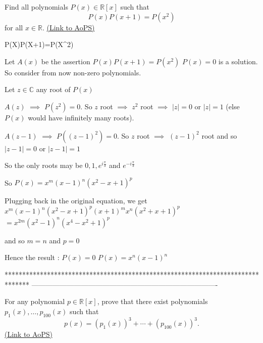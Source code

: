 \begin{problem}
	Find all polynomials $ P(x)\in\mathbb R[x]$ such that \[ P(x)P(x+1)=P(x^2)\] for all $x \in \mathbb R$.
	\flushright \href{https://artofproblemsolving.com/community/c6h316390}{(Link to AoPS)}
\end{problem}



\begin{solution}
	\begin{tcolorbox}P(X)P(X+1)=P(X^2)\end{tcolorbox}

Let $ A(x)$ be the assertion $ P(x)P(x+1)=P(x^2)$
$ P(x)=0$ is a solution. So consider from now non-zero polynomials.

Let $ z\in\mathbb C$ any root of $ P(x)$

$ A(z)$ $ \implies$ $ P(z^2)=0$. So $ z$ root $ \implies$ $ z^2$ root $ \implies$ $ |z|=0$ or $ |z|=1$ (else $ P(x)$ would have infinitely many roots).

$ A(z-1)$ $ \implies$ $ P((z-1)^2)=0$. So $ z$ root $ \implies$ $ (z-1)^2$ root and so $ |z-1|=0$ or $ |z-1|=1$

So the only roots may be $ 0,1,e^{i\frac{\pi}3}$ and $ e^{-i\frac{\pi}3}$

So $ P(x)=x^m(x-1)^n(x^2-x+1)^p$

Plugging back in the original equation, we get $ x^m(x-1)^n(x^2-x+1)^p(x+1)^mx^n(x^2+x+1)^p$ $ =x^{2m}(x^2-1)^{n}(x^4-x^2+1)^{p}$

and so $ m=n$ and $ p=0$ 

Hence the result : 
$ P(x)=0$
$ P(x)=x^n(x-1)^n$
\end{solution}
*******************************************************************************
-------------------------------------------------------------------------------

\begin{problem}
	For any polynomial $ p \in \mathbb R[x]$, prove that there exist polynomials $ p_1(x),\ldots,p_{100}(x)$ such that 
\[ p(x)=(p_1(x))^3+\cdots+(p_{100}(x))^3.\]
	\flushright \href{https://artofproblemsolving.com/community/c6h316460}{(Link to AoPS)}
\end{problem}




